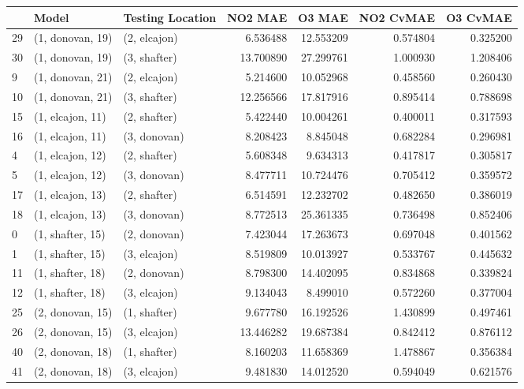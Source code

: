 \begin{tabular}{lllrrrr}
\toprule
{} &             Model & Testing Location &    NO2 MAE &     O3 MAE &  NO2 CvMAE &  O3 CvMAE \\
\midrule
29 &  (1, donovan, 19) &     (2, elcajon) &   6.536488 &  12.553209 &   0.574804 &  0.325200 \\
30 &  (1, donovan, 19) &     (3, shafter) &  13.700890 &  27.299761 &   1.000930 &  1.208406 \\
9  &  (1, donovan, 21) &     (2, elcajon) &   5.214600 &  10.052968 &   0.458560 &  0.260430 \\
10 &  (1, donovan, 21) &     (3, shafter) &  12.256566 &  17.817916 &   0.895414 &  0.788698 \\
15 &  (1, elcajon, 11) &     (2, shafter) &   5.422440 &  10.004261 &   0.400011 &  0.317593 \\
16 &  (1, elcajon, 11) &     (3, donovan) &   8.208423 &   8.845048 &   0.682284 &  0.296981 \\
4  &  (1, elcajon, 12) &     (2, shafter) &   5.608348 &   9.634313 &   0.417817 &  0.305817 \\
5  &  (1, elcajon, 12) &     (3, donovan) &   8.477711 &  10.724476 &   0.705412 &  0.359572 \\
17 &  (1, elcajon, 13) &     (2, shafter) &   6.514591 &  12.232702 &   0.482650 &  0.386019 \\
18 &  (1, elcajon, 13) &     (3, donovan) &   8.772513 &  25.361335 &   0.736498 &  0.852406 \\
0  &  (1, shafter, 15) &     (2, donovan) &   7.423044 &  17.263673 &   0.697048 &  0.401562 \\
1  &  (1, shafter, 15) &     (3, elcajon) &   8.519809 &  10.013927 &   0.533767 &  0.445632 \\
11 &  (1, shafter, 18) &     (2, donovan) &   8.798300 &  14.402095 &   0.834868 &  0.339824 \\
12 &  (1, shafter, 18) &     (3, elcajon) &   9.134043 &   8.499010 &   0.572260 &  0.377004 \\
25 &  (2, donovan, 15) &     (1, shafter) &   9.677780 &  16.192526 &   1.430899 &  0.497461 \\
26 &  (2, donovan, 15) &     (3, elcajon) &  13.446282 &  19.687384 &   0.842412 &  0.876112 \\
40 &  (2, donovan, 18) &     (1, shafter) &   8.160203 &  11.658369 &   1.478867 &  0.356384 \\
41 &  (2, donovan, 18) &     (3, elcajon) &   9.481830 &  14.012520 &   0.594049 &  0.621576 \\

\end{tabular}
